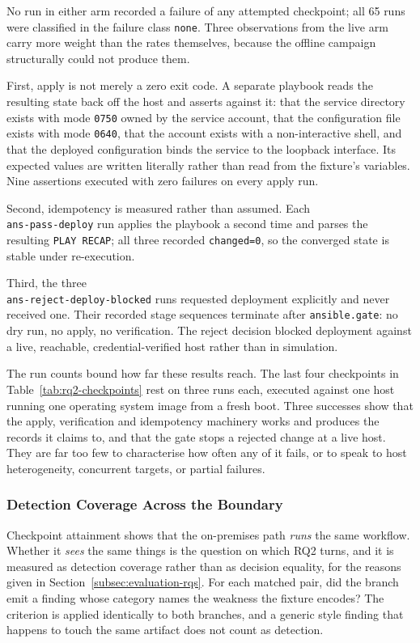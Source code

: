 No run in either arm recorded a failure of any attempted checkpoint; all 65 runs
were classified in the failure class \texttt{none}. Three observations from the
live arm carry more weight than the rates themselves, because the offline
campaign structurally could not produce them.

First, apply is not merely a zero exit code. A separate playbook reads the
resulting state back off the host and asserts against it: that the service
directory exists with mode \texttt{0750} owned by the service account, that the
configuration file exists with mode \texttt{0640}, that the account exists with a
non-interactive shell, and that the deployed configuration binds the service to
the loopback interface. Its expected values are written literally rather than
read from the fixture's variables. Nine assertions executed with zero failures on
every apply run.

Second, idempotency is measured rather than assumed. Each \\ \texttt{ans-pass-deploy}
run applies the playbook a second time and parses the resulting \texttt{PLAY
RECAP}; all three recorded \texttt{changed=0}, so the converged state is stable
under re-execution.

Third, the three \\ \texttt{ans-reject-deploy-blocked} runs requested deployment
explicitly and never received one. Their recorded stage sequences terminate after
\texttt{ansible.gate}: no dry run, no apply, no verification. The reject
decision blocked deployment against a live, reachable, credential-verified host
rather than in simulation.

The run counts bound how far these results reach. The last four checkpoints in
Table~\ref{tab:rq2-checkpoints} rest on three runs each, executed against one
host running one operating system image from a fresh boot. Three successes show
that the apply, verification and idempotency machinery works and produces the
records it claims to, and that the gate stops a rejected change at a live host.
They are far too few to characterise how often any of it fails, or to speak to
host heterogeneity, concurrent targets, or partial failures.

\subsubsection{Detection Coverage Across the Boundary}
\label{subsec:evaluation-results-parity}

Checkpoint attainment shows that the on-premises path \emph{runs} the same
workflow. Whether it \emph{sees} the same things is the question on which RQ2
turns, and it is measured as detection coverage rather than as decision
equality, for the reasons given in
Section~\ref{subsec:evaluation-rqs}. For each matched pair, did the branch emit
a finding whose category names the weakness the fixture encodes? The criterion
is applied identically to both branches, and a generic style finding that
happens to touch the same artifact does not count as detection.


